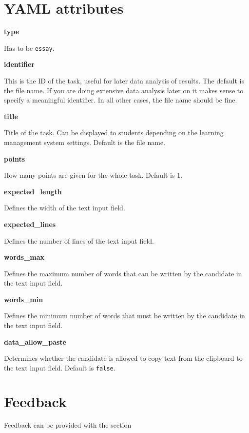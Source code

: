 \documentclass[twoside]{tufte-book}
\begin{document}
\section{YAML attributes}\label{YAML-attributes-4}

\noindent\textbf{type}\label{type-4}

Has to be \texttt{essay}.

\noindent\textbf{identifier}\label{identifier-4}

This is the ID of the task, useful for later data analysis of results. The default is the file name. If you are doing extensive data analysis later on it makes sense to specify a meaningful identifier. In all other cases, the file name should be fine.

\noindent\textbf{title}\label{title-4}

Title of the task. Can be displayed to students depending on the learning management system settings. Default is the file name.

\noindent\textbf{points}\label{points-5}

How many points are given for the whole task. Default is 1.

\noindent\textbf{expected\_length}\label{expected_length-2}

Defines the width of the text input field.

\noindent\textbf{expected\_lines}\label{expected_lines}

Defines the number of lines of the text input field.

\noindent\textbf{words\_max}\label{words_max}

Defines the maximum number of words that can be written by the candidate in the text input field.

\noindent\textbf{words\_min}\label{words_min}

Defines the minimum number of words that must be written by the candidate in the text input field.

\noindent\textbf{data\_allow\_paste}\label{data_allow_paste}

Determines whether the candidate is allowed to copy text from the clipboard to the text input field. Default is \texttt{false}.

\section{Feedback}\label{feedback-4}

Feedback can be provided with the section
\end{document}

